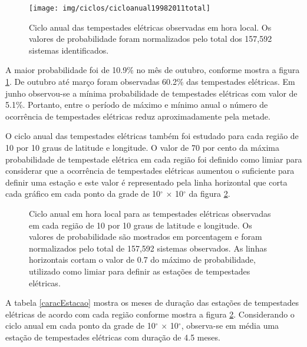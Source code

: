\begin{figure}[!h]
\centering
{\texttt{[image: img/ciclos/cicloanual19982011total]}}
\caption{Ciclo anual das tempestades elétricas observadas em hora local. Os valores de probabilidade foram normalizados pelo total dos 157,592 sistemas identificados.}
\label{cicloanualtotal}
\end{figure} 

A maior probabilidade foi de 10.9\%  no mês de outubro, conforme mostra a figura \ref{cicloanualtotal}. De outubro até março foram observadas 60.2\% das tempestades elétricas. Em junho observou-se a mínima probabilidade de tempestades elétricas com valor de 5.1\%. Portanto, entre o período de máximo e mínimo anual o número de ocorrência de tempestades elétricas reduz aproximadamente pela metade.



O ciclo anual das tempestades elétricas também foi estudado para cada região de 10 por 10 graus de latitude e longitude. O valor de 70 por cento da máxima probabilidade de tempestade elétrica em cada região foi definido como limiar para considerar que a ocorrência de tempestades elétricas aumentou o suficiente para definir uma estação e este valor é representado pela linha horizontal que corta cada gráfico em cada ponto da grade de 10$^{\circ}$ $\times$ 10$^{\circ}$ da figura \ref{anual}. 

\begin{figure}[!h]
\caption{Ciclo anual em hora local para as tempestades elétricas observadas em cada região de 10 por 10 graus de latitude e longitude. Os valores de probabilidade são mostrados em porcentagem e foram normalizados pelo total de 157,592 sistemas observados. As linhas horizontais cortam o valor de 0.7 do máximo de probabilidade, utilizado como limiar para definir as estações de tempestades elétricas.}
\label{anual}
\end{figure}

A tabela \ref{caracEstacao} mostra os meses de duração das estações de tempestades elétricas de acordo com cada região conforme mostra a figura \ref{anual}. Considerando o ciclo anual em cada ponto da grade de 10$^{\circ}$ $\times$ 10$^{\circ}$, observa-se em média uma estação de tempestades elétricas com duração de 4.5 meses. 


